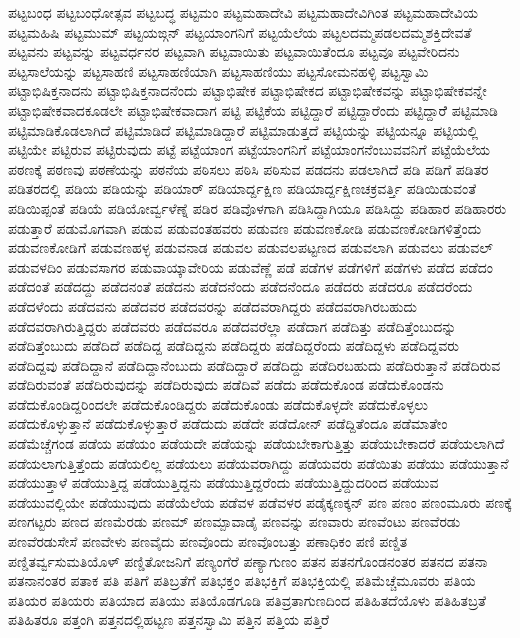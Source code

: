 {ಪಟ್ಟಬಂಧ
ಪಟ್ಟಬಂಧೋತ್ಸವ
ಪಟ್ಟಬದ್ಧ
ಪಟ್ಟಮಂ
ಪಟ್ಟಮಹಾದೇವಿ
ಪಟ್ಟಮಹಾದೇವಿಗಿಂತ
ಪಟ್ಟಮಹಾದೇವಿಯ
ಪಟ್ಟಮಹಿಷಿ
ಪಟ್ಟಮುಮ್
ಪಟ್ಟಯಙ್ಗನ್
ಪಟ್ಟಯಾಂಗನಿಗೆ
ಪಟ್ಟಯೆಲೆಯ
ಪಟ್ಟಲದಮ್ಮಪಡಲದಮ್ಮಶಕ್ತಿದೇವತೆ
ಪಟ್ಟವನು
ಪಟ್ಟವನ್ನು
ಪಟ್ಟವರ್ಧನರ
ಪಟ್ಟವಾಗಿ
ಪಟ್ಟವಾಯಿತು
ಪಟ್ಟವಾಯಿತೆಂದೂ
ಪಟ್ಟವೂ
ಪಟ್ಟವೇರಿದನು
ಪಟ್ಟಸಾಲೆಯನ್ನು
ಪಟ್ಟಸಾಹಣಿ
ಪಟ್ಟಸಾಹಣಿಯಾಗಿ
ಪಟ್ಟಸಾಹಣಿಯು
ಪಟ್ಟಸೋಮನಹಳ್ಳಿ
ಪಟ್ಟಸ್ವಾಮಿ
ಪಟ್ಟಾಭಿಷಿಕ್ತನಾದನು
ಪಟ್ಟಾಭಿಷಿಕ್ತನಾದನೆಂದು
ಪಟ್ಟಾಭಿಷೇಕ
ಪಟ್ಟಾಭಿಷೇಕದ
ಪಟ್ಟಾಭಿಷೇಕವನ್ನು
ಪಟ್ಟಾಭಿಷೇಕವನ್ನೇ
ಪಟ್ಟಾಭಿಷೇಕವಾದಕೂಡಲೇ
ಪಟ್ಟಾಭಿಷೇಕವಾದಾಗ
ಪಟ್ಟಿ
ಪಟ್ಟಿಕೆಯ
ಪಟ್ಟಿದ್ದಾರೆ
ಪಟ್ಟಿದ್ದಾರೆಂದು
ಪಟ್ಟಿದ್ದಾರೆೆ
ಪಟ್ಟಿಮಾಡಿ
ಪಟ್ಟಿಮಾಡಿಕೊಡಲಾಗಿದೆ
ಪಟ್ಟಿಮಾಡಿದೆ
ಪಟ್ಟಿಮಾಡಿದ್ದಾರೆ
ಪಟ್ಟಿಮಾಡುತ್ತದೆ
ಪಟ್ಟಿಯನ್ನು
ಪಟ್ಟಿಯನ್ನೂ
ಪಟ್ಟಿಯಲ್ಲಿ
ಪಟ್ಟಿಯೇ
ಪಟ್ಟಿರುವ
ಪಟ್ಟಿರುವುದು
ಪಟ್ಟೆ
ಪಟ್ಟೆಯಾಂಗ
ಪಟ್ಟೆಯಾಂಗನಿಗೆ
ಪಟ್ಟೆಯಾಂಗನೆಂಬುವವನಿಗೆ
ಪಟ್ಟೆಯೆಲೆಯ
ಪಠಣಕ್ಕೆ
ಪಠಣವು
ಪಠಣೆಯನ್ನು
ಪಠನೆಯ
ಪಠಿಸಲು
ಪಠಿಸಿ
ಪಠಿಸುವ
ಪಡದನು
ಪಡಲಾಗಿದೆ
ಪಡಿ
ಪಡಿಗೆ
ಪಡಿತರ
ಪಡಿತರದಲ್ಲಿ
ಪಡಿಯ
ಪಡಿಯನ್ನು
ಪಡಿಯಾರ್
ಪಡಿಯಾರ್ದ್ದಕ್ಷಿಣ
ಪಡಿಯಾರ್ದ್ದಕ್ಷಿಣಚಕ್ರವರ್ತ್ತಿ
ಪಡಿಯಿಡುವಂತೆ
ಪಡಿಯಿಪ್ಪಂತೆ
ಪಡಿಯೆ
ಪಡಿಯೋರ್ವ್ವಳೆಣ್ನೆ
ಪಡಿರ
ಪಡಿವೊಳಗಾಗಿ
ಪಡಿಸಿದ್ದಾಗಿಯೂ
ಪಡಿಸಿದ್ದು
ಪಡಿಹಾರ
ಪಡಿಹಾರರು
ಪಡುತ್ತಾರೆ
ಪಡುಮೊಗವಾಗಿ
ಪಡುವ
ಪಡುವಂತಹವರು
ಪಡುವಣ
ಪಡುವಣಕೋಡಿ
ಪಡುವಣಕೋಡಿಗಳಿತ್ತೆಂದು
ಪಡುವಣಕೋಡಿಗೆ
ಪಡುವಣಹಳ್ಳ
ಪಡುವನಾಡ
ಪಡುವಲ
ಪಡುವಲಪಟ್ಟಣದ
ಪಡುವಲಾಗಿ
ಪಡುವಲು
ಪಡುವಲ್
ಪಡುವಳದಿಂ
ಪಡುವಸಾಗರ
ಪಡುವಾಯ್ಕಾವೇರಿಯ
ಪಡುವೆಣ್ಣೆ
ಪಡೆ
ಪಡೆಗಳ
ಪಡೆಗಳಿಗೆ
ಪಡೆಗಳು
ಪಡೆದ
ಪಡೆದಂ
ಪಡೆದಂತೆ
ಪಡೆದದ್ದು
ಪಡೆದನಂತೆ
ಪಡೆದನು
ಪಡೆದನೆಂದು
ಪಡೆದನೆಂದೂ
ಪಡೆದರು
ಪಡೆದರೂ
ಪಡೆದರೆಂದು
ಪಡೆದಳೆಂದು
ಪಡೆದವನು
ಪಡೆದವರ
ಪಡೆದವರನ್ನು
ಪಡೆದವರಾಗಿದ್ದರು
ಪಡೆದವರಾಗಿರಬಹುದು
ಪಡೆದವರಾಗಿರುತ್ತಿದ್ದರು
ಪಡೆದವರು
ಪಡೆದವರೂ
ಪಡೆದವರೆಲ್ಲಾ
ಪಡೆದಾಗ
ಪಡೆದಿತ್ತು
ಪಡೆದಿತ್ತೆಂಬುದನ್ನು
ಪಡೆದಿತ್ತೆಂಬುದು
ಪಡೆದಿದೆ
ಪಡೆದಿದ್ದ
ಪಡೆದಿದ್ದನು
ಪಡೆದಿದ್ದರು
ಪಡೆದಿದ್ದರೆಂದು
ಪಡೆದಿದ್ದಳು
ಪಡೆದಿದ್ದವರು
ಪಡೆದಿದ್ದವು
ಪಡೆದಿದ್ದಾನೆ
ಪಡೆದಿದ್ದಾನೆಂಬುದು
ಪಡೆದಿದ್ದಾರೆ
ಪಡೆದಿದ್ದು
ಪಡೆದಿರಬಹುದು
ಪಡೆದಿರುತ್ತಾನೆ
ಪಡೆದಿರುವ
ಪಡೆದಿರುವಂತೆ
ಪಡೆದಿರುವುದನ್ನು
ಪಡೆದಿರುವುದು
ಪಡೆದಿವೆ
ಪಡೆದು
ಪಡೆದುಕೊಂಡ
ಪಡೆದುಕೊಂಡನು
ಪಡೆದುಕೊಂಡಿದ್ದರಿಂದಲೇ
ಪಡೆದುಕೊಂಡಿದ್ದರು
ಪಡೆದುಕೊಂಡು
ಪಡೆದುಕೊಳ್ಳದೇ
ಪಡೆದುಕೊಳ್ಳಲು
ಪಡೆದುಕೊಳ್ಳುತ್ತಾನೆ
ಪಡೆದುಕೊಳ್ಳುತ್ತಾರೆ
ಪಡೆದುದು
ಪಡೆದೇ
ಪಡೆದೋನ್
ಪಡೆದ್ದಿತೆಂದೂ
ಪಡೆಮಾತೇಂ
ಪಡೆಮೆಚ್ಚೆಗಂಡ
ಪಡೆಯ
ಪಡೆಯಂ
ಪಡೆಯದೇ
ಪಡೆಯನ್ನು
ಪಡೆಯಬೇಕಾಗುತ್ತಿತ್ತು
ಪಡೆಯಬೇಕಾದರೆ
ಪಡೆಯಲಾಗಿದೆ
ಪಡೆಯಲಾಗುತ್ತಿತ್ತೆಂದು
ಪಡೆಯಲಿಲ್ಲ
ಪಡೆಯಲು
ಪಡೆಯವರಾಗಿದ್ದು
ಪಡೆಯವರು
ಪಡೆಯಿತು
ಪಡೆಯು
ಪಡೆಯುತ್ತಾನೆ
ಪಡೆಯುತ್ತಾಳೆ
ಪಡೆಯುತ್ತಿದ್ದ
ಪಡೆಯುತ್ತಿದ್ದನು
ಪಡೆಯುತ್ತಿದ್ದರೆಂದು
ಪಡೆಯುತ್ತಿದ್ದುದರಿಂದ
ಪಡೆಯುವ
ಪಡೆಯುವಲ್ಲಿಯೇ
ಪಡೆಯುವುದು
ಪಡೆಯೆಲೆಯ
ಪಡೆವಳ
ಪಡೆವಳರ
ಪಡೈಕ್ಕಣಕ್ಕನ್
ಪಣ
ಪಣಂ
ಪಣಂಮೂರು
ಪಣಕ್ಕೆ
ಪಣಗಟ್ಟರು
ಪಣದ
ಪಣಮೆರಡು
ಪಣಮ್
ಪಣಮ್ಪಾವಾಡೈ
ಪಣವನ್ನು
ಪಣವಾರು
ಪಣವೆಂಟು
ಪಣವೆರಡು
ಪಣವೆರಡುಸೇಸೆ
ಪಣವೇಳು
ಪಣವೈದು
ಪಣವೊಂದು
ಪಣವೊಂಬತ್ತು
ಪಣಾಧಿಕಂ
ಪಣಿ
ಪಣ್ಡಿತ
ಪಣ್ಡಿತರ್ವ್ವಸುಮತಿಯೊಳ್
ಪಣ್ಡಿತೋಜನಿಗೆ
ಪಣ್ಯಂಗೆರೆ
ಪಣ್ಯಾಗುಣಂ
ಪತನ
ಪತನಗೊಂಡನಂತರ
ಪತನದ
ಪತನಾ
ಪತನಾನಂತರ
ಪತಾಕ
ಪತಿ
ಪತಿಗೆ
ಪತಿಬ್ರತೆಗೆ
ಪತಿಭಕ್ತಂ
ಪತಿಭಕ್ತಿಗೆ
ಪತಿಭಕ್ತಿಯಲ್ಲಿ
ಪತಿಮೆಚ್ಚೆಮೂವರು
ಪತಿಯ
ಪತಿಯರ
ಪತಿಯರು
ಪತಿಯಾದ
ಪತಿಯು
ಪತಿಯೊಡಗೂಡಿ
ಪತಿವ್ರತಾಗುಣದಿಂದ
ಪತಿಹಿತದೆಯೊಳು
ಪತಿಹಿತಬ್ರತೆ
ಪತಿಹಿತರೂ
ಪತ್ತಂಗಿ
ಪತ್ತನದಲ್ಲಿಹಟ್ಟಣ
ಪತ್ತನಸ್ವಾಮಿ
ಪತ್ತಿನ
ಪತ್ತಿಯ
ಪತ್ತಿರೆ
}
